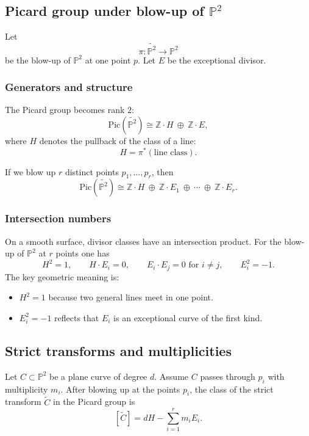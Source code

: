 \documentclass[12pt,a4paper]{article}
\theoremstyle{plain}
\theoremstyle{definition}      %
\begin{document}
\subsection*{Picard group under blow-up of $\mathbb P^2$}

Let
\[
\pi:\widetilde{\mathbb P^2}\to \mathbb P^2
\]
be the blow-up of $\mathbb P^2$ at one point $p$.
Let $E$ be the exceptional divisor.

\subsubsection*{Generators and structure}

The Picard group becomes rank $2$:
\[
\mathrm{Pic}(\widetilde{\mathbb P^2})
\cong
\mathbb Z\cdot H \ \oplus\ \mathbb Z\cdot E,
\]
where $H$ denotes the pullback of the class of a line:
\[
H=\pi^{*}(\text{line class}).
\]

If we blow up $r$ distinct points $p_1,\dots,p_r$, then
\[
\mathrm{Pic}(\widetilde{\mathbb P^2})
\cong
\mathbb Z\cdot H \ \oplus\ \mathbb Z\cdot E_1 \ \oplus\ \cdots\ \oplus\ \mathbb Z\cdot E_r.
\]

\subsubsection*{Intersection numbers}

On a smooth surface, divisor classes have an intersection product.
For the blow-up of $\mathbb P^2$ at $r$ points one has
\[
H^2=1,
\qquad
H\cdot E_i=0,
\qquad
E_i\cdot E_j=0 \text{ for } i\neq j,
\qquad
E_i^2=-1.
\]
The key geometric meaning is:
\begin{itemize}
	\item $H^2=1$ because two general lines meet in one point.
	\item $E_i^2=-1$ reflects that $E_i$ is an exceptional curve of the first kind.
\end{itemize}

\subsection*{Strict transforms and multiplicities}

Let $C\subset \mathbb P^2$ be a plane curve of degree $d$.
Assume $C$ passes through $p_i$ with multiplicity $m_i$.
After blowing up at the points $p_i$, the class of the strict transform $\widetilde C$ in the Picard group is
\[
[\widetilde C]
=
dH-\sum_{i=1}^r m_i E_i.
\]
\end{document}
